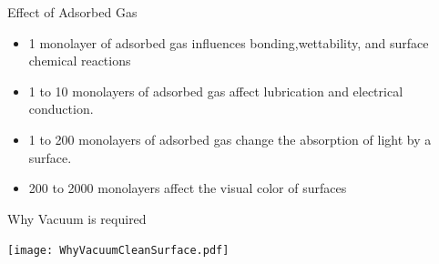 \documentclass[11]{beamer}
\begin{document}
\begin{frame}{Effect of Adsorbed Gas}

\begin{exampleblock}

	\begin{itemize}
		\item 1 monolayer of adsorbed gas influences bonding,wettability, and surface chemical reactions
		\item 1 to 10 monolayers of adsorbed gas affect lubrication and electrical conduction.
		\item 1 to 200 monolayers of adsorbed gas change the absorption of light by a surface.
		\item 200 to 2000 monolayers affect the visual color of surfaces
	\end{itemize}

\end{exampleblock}

\end{frame}

\begin{frame}{Why Vacuum is required}

       \begin{center}
			\texttt{[image: WhyVacuumCleanSurface.pdf]}
		\end{center}


\end{frame}
\end{document}
